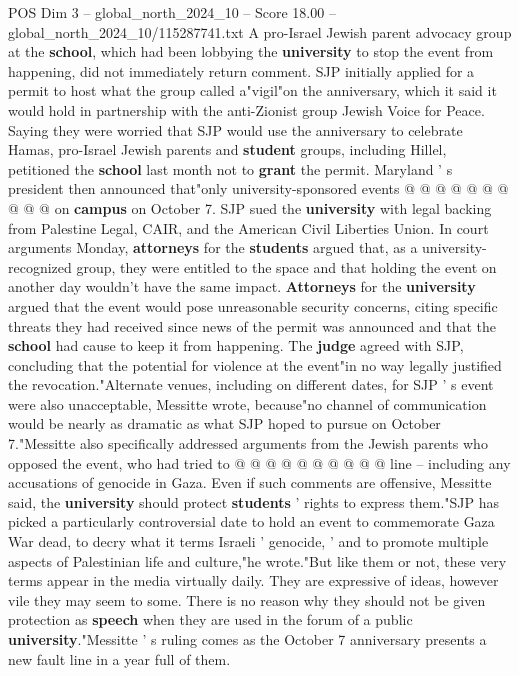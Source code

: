 \begin{textsample}{POS Dim 3 – global\_north\_2024\_10 – Score 18.00 – global\_north\_2024\_10/115287741.txt}
A pro-Israel Jewish parent advocacy group at the \textbf{school}, which had been lobbying the \textbf{university} to stop the event from happening, did not immediately return comment.
SJP initially applied for a permit to host what the group called a"vigil"on the anniversary, which it said it would hold in partnership with the anti-Zionist group Jewish Voice for Peace.
Saying they were worried that SJP would use the anniversary to celebrate Hamas, pro-Israel Jewish parents and \textbf{student} groups, including Hillel, petitioned the \textbf{school} last month not to \textbf{grant} the permit.
Maryland ' s president then announced that"only university-sponsored events @ @ @ @ @ @ @ @ @ @ on \textbf{campus} on October 7.
SJP sued the \textbf{university} with legal backing from Palestine Legal, CAIR, and the American Civil Liberties Union.
In court arguments Monday, \textbf{attorneys} for the \textbf{students} argued that, as a university-recognized group, they were entitled to the space and that holding the event on another day wouldn't have the same impact. \textbf{Attorneys} for the \textbf{university} argued that the event would pose unreasonable security concerns, citing specific threats they had received since news of the permit was announced and that the \textbf{school} had cause to keep it from happening.
The \textbf{judge} agreed with SJP, concluding that the potential for violence at the event"in no way legally justified the revocation."Alternate venues, including on different dates, for SJP ' s event were also unacceptable, Messitte wrote, because"no channel of communication would be nearly as dramatic as what SJP hoped to pursue on October 7."Messitte also specifically addressed arguments from the Jewish parents who opposed the event, who had tried to @ @ @ @ @ @ @ @ @ @ line -- including any accusations of genocide in Gaza.
Even if such comments are offensive, Messitte said, the \textbf{university} should protect \textbf{students} ' rights to express them."SJP has picked a particularly controversial date to hold an event to commemorate Gaza War dead, to decry what it terms Israeli ' genocide, ' and to promote multiple aspects of Palestinian life and culture,"he wrote."But like them or not, these very terms appear in the media virtually daily.
They are expressive of ideas, however vile they may seem to some.
There is no reason why they should not be given protection as \textbf{speech} when they are used in the forum of a public \textbf{university}."Messitte ' s ruling comes as the October 7 anniversary presents a new fault line in a year full of them.

\end{textsample}
